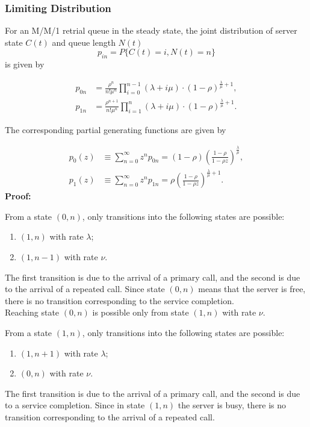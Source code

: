 \documentclass[10pt]{article}
\begin{document}
\subsubsection{Limiting Distribution}
For an M/M/1 retrial queue in the steady state, the joint distribution of server state $C(t)$ and queue length $N(t)$
$$p_{in} = P\{C(t) = i, N(t) = n\}$$
is given by

\begin{align*}
p_{0n} &= \frac{\rho^{n}}{n!\mu^{n}} \prod_{i = 0}^{n - 1}(\lambda + i\mu) \cdot (1 - \rho)^{\frac{\lambda}{\mu} + 1}, \\
p_{1n} &= \frac{\rho^{n + 1}}{n!\mu^{n}} \prod_{i = 1}^{n}(\lambda + i\mu) \cdot (1 - \rho)^{\frac{\lambda}{\mu} + 1}.
\end{align*}

The corresponding partial generating functions are given by

\begin{align*}
p_{0}(z) &\equiv \sum_{n = 0}^{\infty} z^{n} p_{0n} = (1 - \rho) \left( \frac{1 - \rho}{1 - \rho z} \right)^{\frac{\lambda}{\mu}}, \\
p_{1}(z) &\equiv \sum_{n = 0}^{\infty} z^{n} p_{1n} = \rho \left( \frac{1 - \rho}{1 - \rho z} \right)^{\frac{\lambda}{\mu} + 1}.
\end{align*}
\textbf{Proof:}

From a state $(0, n)$, only transitions into the following states are possible:
\begin{enumerate}

\item $(1, n)$ with rate $\lambda$;
\item $(1, n - 1)$ with rate $\nu$.
\end{enumerate}
The first transition is due to the arrival of a primary call, and the second is due to the arrival of a repeated call. Since state $(0, n)$ means that the server is free, there is no transition corresponding to the service completion. \\

Reaching state $(0, n)$ is possible only from state $(1, n)$ with rate $\nu$.

From a state $(1, n)$, only transitions into the following states are possible:
\begin{enumerate}
\item $(1, n + 1)$ with rate $\lambda$;
\item $(0, n)$ with rate $\nu$.
\end{enumerate}
The first transition is due to the arrival of a primary call, and the second is due to a service completion. Since in state $(1, n)$ the server is busy, there is no transition corresponding to the arrival of a repeated call.\\
\end{document}
